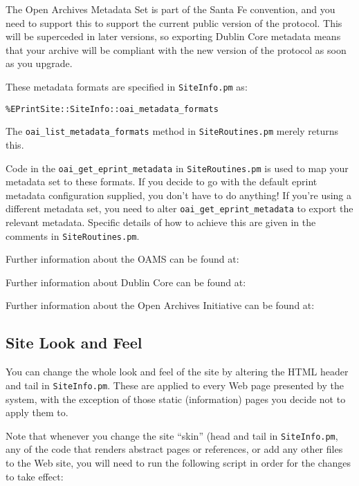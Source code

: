 The Open Archives Metadata Set is part of the Santa Fe convention, and you need to support this to support the current public version of the protocol. This will be superceded in later versions, so exporting Dublin Core metadata means that your archive will be compliant with the new version of the protocol as soon as you upgrade.

These metadata formats are specified in {\tt SiteInfo.pm} as:

\begin{verbatim}
%EPrintSite::SiteInfo::oai_metadata_formats
\end{verbatim}

The {\tt oai\_list\_metadata\_formats} method in {\tt SiteRoutines.pm} merely returns this.

Code in the {\tt oai\_get\_eprint\_metadata} in {\tt SiteRoutines.pm} is used to map your metadata set to these formats. If you decide to go with the default eprint metadata configuration supplied, you don't have to do anything! If you're using a different metadata set, you need to alter {\tt oai\_get\_eprint\_metadata} to export the relevant metadata. Specific details of how to achieve this are given in the comments in {\tt SiteRoutines.pm}.

Further information about the OAMS can be found at:


Further information about Dublin Core can be found at:


Further information about the Open Archives Initiative can be found at:



\subsection{Site Look and Feel}
\label{install_laf}

You can change the whole look and feel of the site by altering the HTML header and tail in {\tt SiteInfo.pm}. These are applied to every Web page presented by the system, with the exception of those static (information) pages you decide not to apply them to.

Note that whenever you change the site ``skin'' (head and tail in {\tt SiteInfo.pm}, any of the code that renders abstract pages or references, or add any other files to the Web site, you will need to run the following script in order for the changes to take effect:

